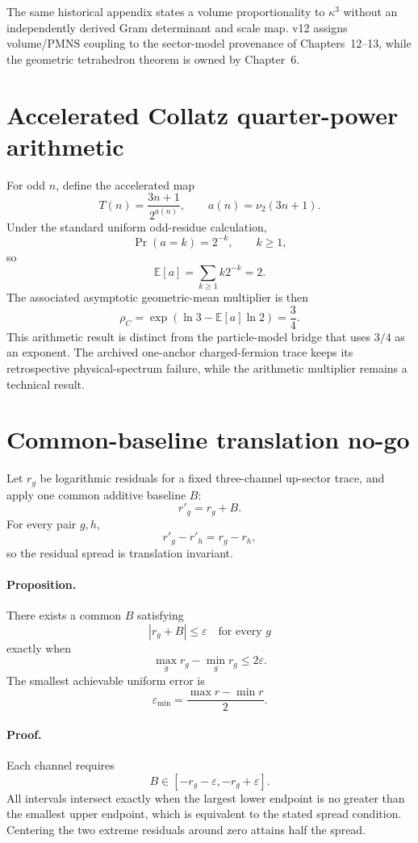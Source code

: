 The same historical appendix states a volume proportionality to \(\kappa^3\)
without an independently derived Gram determinant and scale map.  v12 assigns
volume/PMNS coupling to the sector-model provenance of Chapters~12--13, while
the geometric tetrahedron theorem is owned by Chapter~6.

\section{Accelerated Collatz quarter-power arithmetic}

For odd \(n\), define the accelerated map
\[
T(n)=\frac{3n+1}{2^{a(n)}},
\qquad
a(n)=\nu_2(3n+1).
\]
Under the standard uniform odd-residue calculation,
\[
\Pr(a=k)=2^{-k},\qquad k\ge1,
\]
so
\[
\mathbb E[a]=\sum_{k\ge1}k2^{-k}=2.
\]
The associated asymptotic geometric-mean multiplier is then
\[
\boxed{
\rho_C
=\exp\!\left(\ln3-\mathbb E[a]\ln2\right)
=\frac34.
}
\]
This arithmetic result is distinct from the particle-model bridge that uses
\(3/4\) as an exponent.  The archived one-anchor charged-fermion trace keeps its
retrospective physical-spectrum failure, while the arithmetic multiplier
remains a technical result.

\section{Common-baseline translation no-go}

Let \(r_g\) be logarithmic residuals for a fixed three-channel up-sector trace,
and apply one common additive baseline \(B\):
\[
r'_g=r_g+B.
\]
For every pair \(g,h\),
\[
r'_g-r'_h=r_g-r_h,
\]
so the residual spread is translation invariant.

\paragraph{Proposition.}
There exists a common \(B\) satisfying
\[
|r_g+B|\le\varepsilon
\quad\text{for every }g
\]
exactly when
\[
\max_g r_g-\min_g r_g\le2\varepsilon.
\]
The smallest achievable uniform error is
\[
\boxed{
\varepsilon_{\min}
=\frac{\max r-\min r}{2}.
}
\]

\paragraph{Proof.}
Each channel requires
\[
B\in[-r_g-\varepsilon,-r_g+\varepsilon].
\]
All intervals intersect exactly when the largest lower endpoint is no greater
than the smallest upper endpoint, which is equivalent to the stated spread
condition.  Centering the two extreme residuals around zero attains half the
spread.

